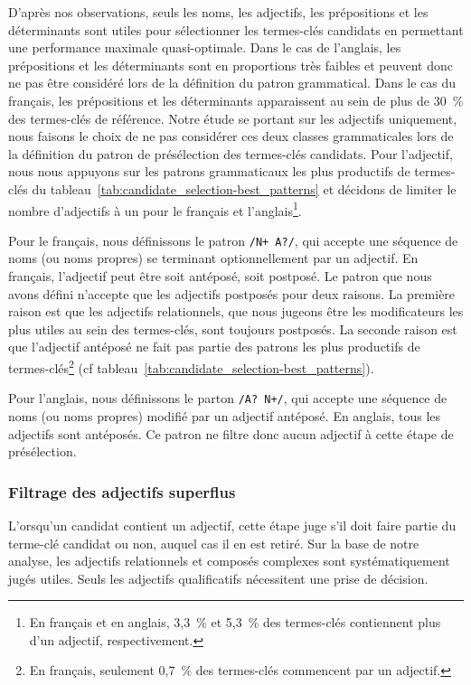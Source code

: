         D'après nos observations, seuls les noms, les adjectifs, les
        prépositions et les déterminants sont utiles pour sélectionner les
        termes-clés candidats en permettant une performance maximale
        quasi-optimale. Dans le cas de l'anglais, les prépositions et les
        déterminants sont en proportions très faibles et peuvent donc ne pas
        être considéré lors de la définition du patron grammatical. Dans le cas
        du français, les prépositions et les déterminants apparaissent au sein
        de plus de 30~\% des termes-clés de référence. Notre étude se portant
        sur les adjectifs uniquement, nous faisons le choix de ne pas considérer
        ces deux classes grammaticales lors de la définition du patron de
        présélection des termes-clés candidats. Pour l'adjectif, nous nous
        appuyons sur les patrons grammaticaux les plus productifs de termes-clés
        du tableau~\ref{tab:candidate_selection-best_patterns} et décidons de
        limiter le nombre d'adjectifs à un pour le français et
        l'anglais\footnote{En français et en anglais, 3,3~\% et 5,3~\% des
        termes-clés contiennent plus d'un adjectif, respectivement.}.
        
        Pour le français, nous définissons le patron \texttt{/N+ A?/}, qui
        accepte une séquence de noms (ou noms propres) se terminant
        optionnellement par un adjectif. En français, l'adjectif peut être soit
        antéposé, soit postposé. Le patron que nous avons défini n'accepte que
        les adjectifs postposés pour deux raisons. La première raison est que
        les adjectifs relationnels, que nous jugeons être les modificateurs les
        plus utiles au sein des termes-clés, sont toujours postposés. La seconde
        raison est que l'adjectif antéposé ne fait pas partie des patrons les
        plus productifs de termes-clés\footnote{En français, seulement 0,7~\%
        des termes-clés commencent par un adjectif.} (cf
        tableau~\ref{tab:candidate_selection-best_patterns}).
        
        Pour l'anglais, nous définissons le parton \texttt{/A? N+/}, qui
        accepte une séquence de noms (ou noms propres) modifié par un adjectif
        antéposé. En anglais, tous les adjectifs sont antéposés. Ce patron ne
        filtre donc aucun adjectif à cette étape de présélection.

      \subsubsection{Filtrage des adjectifs superflus}
      \label{subsubsec:main:domain_independent_keyphrase_extraction-keyphrase_candidate_selection-modifiers_filtering-adjective_filtering}
        L'orsqu'un candidat contient un adjectif, cette étape juge s'il doit
        faire partie du terme-clé candidat ou non, auquel cas il  en est retiré.
        Sur la base de notre analyse, les adjectifs relationnels et composés
        complexes sont systématiquement jugés utiles. Seuls les adjectifs
        qualificatifs nécessitent une prise de décision.

